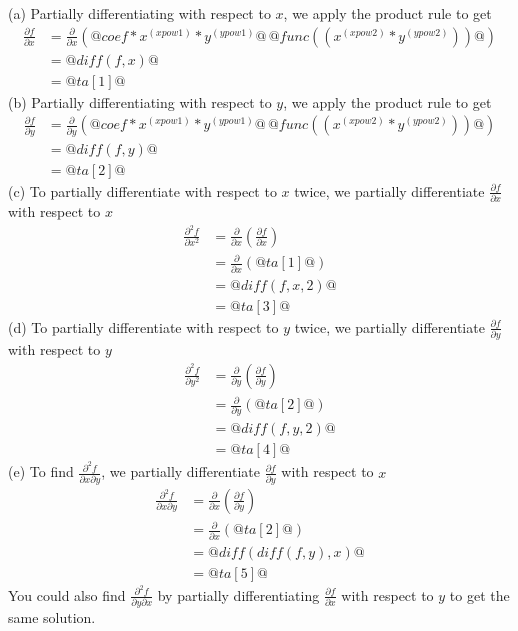 \documentclass[a4paper,10pt]{article}
\begin{document}
(a) Partially differentiating with respect to \(x\), we apply the product rule to get \begin{align*} \frac{\partial f}{\partial x} &= \frac{\partial}{\partial x} \left( @coef*x^(xpow1)*y^(ypow1)@ \, @func((x^(xpow2)*y^(ypow2)))@ \right) \\ &= @diff(f,x)@ \\ &= @ta[1]@ \end{align*}(b) Partially differentiating with respect to \(y\), we apply the product rule to get \begin{align*} \frac{\partial f}{\partial y} &= \frac{\partial}{\partial y} \left( @coef*x^(xpow1)*y^(ypow1)@ \, @func((x^(xpow2)*y^(ypow2)))@ \right) \\ &= @diff(f,y)@ \\ &= @ta[2]@ \end{align*}(c) To partially differentiate with respect to \(x\) twice, we partially differentiate \(\frac{\partial f}{\partial x}\) with respect to \(x\) \begin{align*} \frac{\partial^2 f}{\partial x^2} &= \frac{\partial}{\partial x} \left( \frac{\partial f}{\partial x} \right) \\ &= \frac{\partial}{\partial x} \left( @ta[1]@ \right) \\ &= @diff(f,x,2)@ \\ &= @ta[3]@ \end{align*}(d) To partially differentiate with respect to \(y\) twice, we partially differentiate \(\frac{\partial f}{\partial y}\) with respect to \(y\) \begin{align*} \frac{\partial^2 f}{\partial y^2} &= \frac{\partial}{\partial y} \left( \frac{\partial f}{\partial y} \right) \\ &= \frac{\partial}{\partial y} \left( @ta[2]@ \right) \\ &= @diff(f,y,2)@ \\ &= @ta[4]@ \end{align*} (e) To find \(\frac{\partial^2 f}{\partial x \partial y}\), we partially differentiate \(\frac{\partial f}{\partial y}\) with respect to \(x\) \begin{align*} \frac{\partial^2 f}{\partial x \partial y} &= \frac{\partial}{\partial x} \left( \frac{\partial f}{\partial y} \right) \\ &= \frac{\partial}{\partial x} \left( @ta[2]@ \right) \\ &= @diff(diff(f,y),x)@ \\ &= @ta[5]@ \end{align*} You could also find \(\frac{\partial^2 f}{\partial y \partial x}\) by partially differentiating \(\frac{\partial f}{\partial x}\) with respect to \(y\) to get the same solution.
\end{document}
